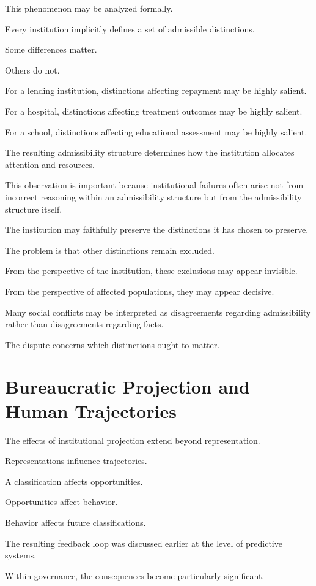 \documentclass[11pt,oneside,openany]{book}
\begin{document}
This phenomenon may be analyzed formally.

Every institution implicitly defines a set of admissible distinctions.

Some differences matter.

Others do not.

For a lending institution, distinctions affecting repayment may be highly salient.

For a hospital, distinctions affecting treatment outcomes may be highly salient.

For a school, distinctions affecting educational assessment may be highly salient.

The resulting admissibility structure determines how the institution allocates attention and resources.

This observation is important because institutional failures often arise not from incorrect reasoning within an admissibility structure but from the admissibility structure itself.

The institution may faithfully preserve the distinctions it has chosen to preserve.

The problem is that other distinctions remain excluded.

From the perspective of the institution, these exclusions may appear invisible.

From the perspective of affected populations, they may appear decisive.

Many social conflicts may be interpreted as disagreements regarding admissibility rather than disagreements regarding facts.

The dispute concerns which distinctions ought to matter.

\section{Bureaucratic Projection and Human Trajectories}

The effects of institutional projection extend beyond representation.

Representations influence trajectories.

A classification affects opportunities.

Opportunities affect behavior.

Behavior affects future classifications.

The resulting feedback loop was discussed earlier at the level of predictive systems.

Within governance, the consequences become particularly significant.
\end{document}
